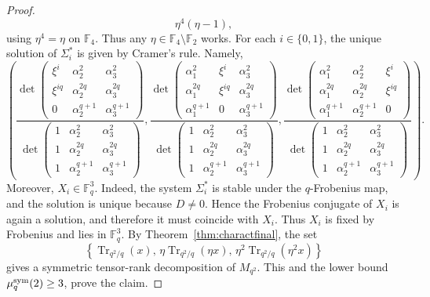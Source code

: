 \documentclass[11pt,a4paper,reqno]{article}
\numberwithin{equation}{section}
\theoremstyle{definition}
\def\sym{\textup{sym}}
\begin{document}
\begin{proof}
\[
\eta^4(\eta-1),
\]
using \(\eta^4=\eta\) on \(\mathbb F_4\). Thus any
\(\eta\in\mathbb F_4\setminus\mathbb F_2\) works. For each \(i\in\{0,1\}\), the unique solution of \(\Sigma_i^*\) is given by
Cramer's rule. Namely,
\[\left( \frac{\det\begin{pmatrix}
\xi^i & \alpha_2^2 & \alpha_3^2\\
\xi^{iq} & \alpha_2^{2	q} & \alpha_3^{2q}\\
0 & \alpha_2^{q+1} &  \alpha_3^{q+1}
\end{pmatrix}}{\det\begin{pmatrix}
1 & \alpha_2^2 & \alpha_3^2\\
1 & \alpha_2^{2	q} & \alpha_3^{2q}\\
1 & \alpha_2^{q+1} &  \alpha_3^{q+1}
\end{pmatrix}}, \frac{\det\begin{pmatrix}
\alpha_1^2 & \xi^i & \alpha_3^2\\
\alpha_1^{2	q} & \xi^{iq} & \alpha_3^{2q}\\
\alpha_1^{q+1} & 0 &   \alpha_3^{q+1}
\end{pmatrix}}{\det\begin{pmatrix}
1 & \alpha_2^2 & \alpha_3^2\\
1 & \alpha_2^{2	q} & \alpha_3^{2q}\\
1 & \alpha_2^{q+1} &  \alpha_3^{q+1}
\end{pmatrix}},
\frac{\det\begin{pmatrix}
\alpha_1^2 & \alpha_2^2 & \xi^i \\
\alpha_1^{2	q}  & \alpha_2^{2q}& \xi^{iq}\\
\alpha_1^{q+1}  &   \alpha_2^{q+1} & 0
\end{pmatrix}}{\det\begin{pmatrix}
1 & \alpha_2^2 & \alpha_3^2\\
1 & \alpha_2^{2	q} & \alpha_3^{2q}\\
1 & \alpha_2^{q+1} &  \alpha_3^{q+1}
\end{pmatrix}}
\right).\]
Moreover, \(X_i\in\mathbb F_q^3\). Indeed, the system \(\Sigma_i^*\) is stable under
the \(q\)-Frobenius map, and the solution is unique because \(D\neq 0\). Hence the
Frobenius conjugate of \(X_i\) is again a solution, and therefore it must coincide
with \(X_i\). Thus \(X_i\) is fixed by Frobenius and lies in \(\mathbb F_q^3\). By Theorem~\ref{thm:charactfinal}, the set
\[
\left\{
\operatorname{Tr}_{q^2/q}(x),\,
\eta\operatorname{Tr}_{q^2/q}(\eta x),\,
\eta^2\operatorname{Tr}_{q^2/q}(\eta^2x)
\right\}
\]
gives a symmetric tensor-rank decomposition of \(M_{q^2}\). This and the lower
bound~\(\mu_q^{\sym}(2)\geq 3\), prove the claim.
\end{proof}
\end{document}

